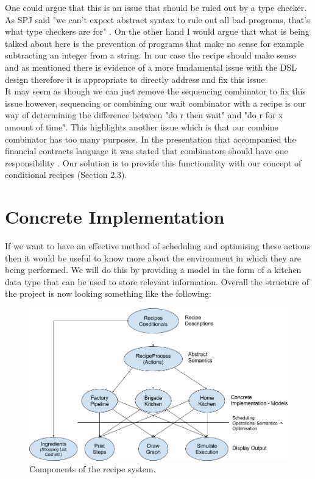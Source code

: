 \documentclass[11pt]{article}
\begin{document}
    One could argue that this is an issue that should be ruled out by a type checker. As SPJ
    said "we can’t expect abstract syntax to rule out all bad programs, that’s what type
    checkers are for" \cite{core}. On the other hand I would argue that what is being talked
    about here is the prevention of programs that make no sense for example subtracting an integer
    from a string. In our case the recipe should make sense and as mentioned there is evidence
    of a more fundamental issue with the DSL design therefore it is appropriate to directly address
    and fix this issue. \\
    
    It may seem as though we can just remove the sequencing combinator to fix this issue however,
    sequencing or combining our wait combinator with a recipe is our way of determining the
    difference between "do r then wait" and "do r for x amount of time". This highlights another
    issue which is that our combine combinator has too many purposes. In the presentation that
    accompanied the financial contracts language it was stated that combinators should have
    one responsibility \cite{contracts-pp}. Our solution is to provide this functionality 
    with our concept of conditional recipes (Section 2.3). \\

    \section{Concrete Implementation}

    If we want to have an effective method of scheduling and optimising these actions then it would
    be useful to know more about the environment in which they are being performed. We will do this
    by providing a model in the form of a kitchen data type that can be used to store relevant
    information. Overall the structure of the project is now looking something like the following:
    
    \begin{figure}[ht]
        \centering
            \includegraphics[width=\textwidth,keepaspectratio]{recipe_flow.png}
        \caption{Components of the recipe system.}
    \end{figure}
\end{document}
